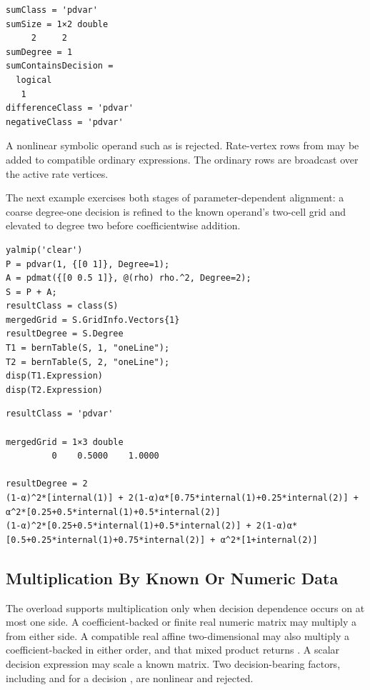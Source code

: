 \begin{lstlisting}[style=dpoutput]
sumClass = 'pdvar'
sumSize = 1×2 double
     2     2
sumDegree = 1
sumContainsDecision =
  logical
   1
differenceClass = 'pdvar'
negativeClass = 'pdvar'
\end{lstlisting}

A nonlinear symbolic operand such as  is rejected. Rate-vertex rows from  may be added to compatible ordinary expressions. The ordinary rows are broadcast over the active rate vertices.

The next example exercises both stages of parameter-dependent alignment: a coarse degree-one decision is refined to the known operand's two-cell grid and elevated to degree two before coefficientwise addition.

\begin{lstlisting}[style=dpmatlab]
yalmip('clear')
P = pdvar(1, {[0 1]}, Degree=1);
A = pdmat({[0 0.5 1]}, @(rho) rho.^2, Degree=2);
S = P + A;
resultClass = class(S)
mergedGrid = S.GridInfo.Vectors{1}
resultDegree = S.Degree
T1 = bernTable(S, 1, "oneLine");
T2 = bernTable(S, 2, "oneLine");
disp(T1.Expression)
disp(T2.Expression)
\end{lstlisting}

\begin{lstlisting}[style=dpwideoutput]
resultClass = 'pdvar'

mergedGrid = 1×3 double
         0    0.5000    1.0000

resultDegree = 2
(1-α)^2*[internal(1)] + 2(1-α)α*[0.75*internal(1)+0.25*internal(2)] + α^2*[0.25+0.5*internal(1)+0.5*internal(2)]
(1-α)^2*[0.25+0.5*internal(1)+0.5*internal(2)] + 2(1-α)α*[0.5+0.25*internal(1)+0.75*internal(2)] + α^2*[1+internal(2)]
\end{lstlisting}

\subsection{Multiplication By Known Or Numeric Data}
\label{sec:pdvar-operator-entries}

The  overload supports multiplication only when decision dependence occurs on at most one side. A coefficient-backed  or finite real numeric matrix may multiply a  from either side. A compatible real affine two-dimensional  may also multiply a coefficient-backed  in either order, and that mixed product returns . A scalar decision expression may scale a known matrix. Two decision-bearing factors, including  and  for a decision , are nonlinear and rejected.


